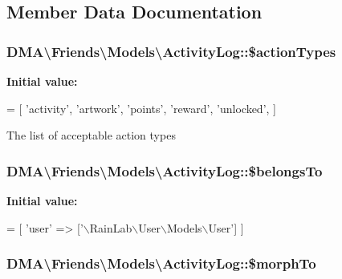 \subsection{Member Data Documentation}
\hypertarget{classDMA_1_1Friends_1_1Models_1_1ActivityLog_aa60b5fe0e1e7c254827bfa35c69aef9d}{
\subsubsection[{\$action\+Types}]{\setlength{\rightskip}{0pt plus 5cm}D\+M\+A\textbackslash{}\+Friends\textbackslash{}\+Models\textbackslash{}\+Activity\+Log\+::\$action\+Types}}\label{classDMA_1_1Friends_1_1Models_1_1ActivityLog_aa60b5fe0e1e7c254827bfa35c69aef9d}
{\bfseries Initial value\+:}
\begin{DoxyCode}
= [
        \textcolor{stringliteral}{'activity'},
        \textcolor{stringliteral}{'artwork'},
        \textcolor{stringliteral}{'points'},
        \textcolor{stringliteral}{'reward'},
        \textcolor{stringliteral}{'unlocked'},
    ]
\end{DoxyCode}
The list of acceptable action types \hypertarget{classDMA_1_1Friends_1_1Models_1_1ActivityLog_aff637d41ffa73260e1ffc1788f5a98d7}{
\subsubsection[{\$belongs\+To}]{\setlength{\rightskip}{0pt plus 5cm}D\+M\+A\textbackslash{}\+Friends\textbackslash{}\+Models\textbackslash{}\+Activity\+Log\+::\$belongs\+To}}\label{classDMA_1_1Friends_1_1Models_1_1ActivityLog_aff637d41ffa73260e1ffc1788f5a98d7}
{\bfseries Initial value\+:}
\begin{DoxyCode}
= [
        \textcolor{stringliteral}{'user'} => [\textcolor{stringliteral}{'\(\backslash\)RainLab\(\backslash\)User\(\backslash\)Models\(\backslash\)User'}]
    ]
\end{DoxyCode}
\hypertarget{classDMA_1_1Friends_1_1Models_1_1ActivityLog_afaa82849e3e93bf41ac948658ac652ff}{
\subsubsection[{\$morph\+To}]{\setlength{\rightskip}{0pt plus 5cm}D\+M\+A\textbackslash{}\+Friends\textbackslash{}\+Models\textbackslash{}\+Activity\+Log\+::\$morph\+To}}\label{classDMA_1_1Friends_1_1Models_1_1ActivityLog_afaa82849e3e93bf41ac948658ac652ff}
